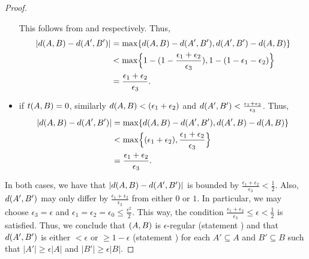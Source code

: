 \begin{lemma}
\begin{proof}
\begin{itemize}
                        This follows from
                         and
                         respectively.
                        Thus,
                        \begin{align*}
                            | d ( A,B ) - d ( A',B' ) |
                                & = \max \{ d ( A,B ) - d ( A',B' ), d ( A',B' ) - d ( A,B ) \} \\
                                & < \max \Bigl\{  1 - ( 1 - \frac{\epsilon_1 + \epsilon_2}{\epsilon_3} ),
                                    1 - ( 1 - \epsilon_1 - \epsilon_2 ) \Bigr\} \\
                                & = \frac{\epsilon_1 + \epsilon_2}{\epsilon_3}.
                        \end{align*}
                    \item if $t( A,B ) = 0$, similarly $d( A,B ) < ( \epsilon_1 + \epsilon_2 )$
                        and $d ( A',B' ) < \frac{\epsilon_1 + \epsilon_2}{\epsilon_3}$.
                        Thus,
                        \begin{align*}
                            | d ( A,B ) - d ( A',B' ) |
                                & = \max \{ d ( A,B ) - d ( A',B' ), d ( A',B ) - d ( A,B ) \} \\
                                & < \max \Bigl\{ ( \epsilon_1 + \epsilon_2 ), \frac{\epsilon_1 + \epsilon_2}{\epsilon_3} \Bigr\} \\
                                & = \frac{\epsilon_1 + \epsilon_2}{\epsilon_3}.
                        \end{align*}
                \end{itemize}
                In both cases, we have that $| d ( A,B ) - d ( A',B' ) |$ is bounded by
                $\frac{\epsilon_1 + \epsilon_2}{\epsilon_3} < \frac{1}{2}$.
                Also, $d ( A', B' )$ may only differ by $\frac{\epsilon_1 + \epsilon_2}{\epsilon_3}$ from either
                $0$ or $1$.
                In particular, we may choose $\epsilon_3 = \epsilon$ and $\epsilon_1 = \epsilon_2 = \epsilon_0 \leq \frac{\epsilon^2}{2}$.
                This way, the condition $\frac{\epsilon_1 + \epsilon_2}{\epsilon_3} \leq \epsilon < \frac{1}{2}$ is satisfied.
                Thus, we conclude that $( A,B )$ is $\epsilon$-regular (statement )
                and that $d ( A',B' )$ is either $< \epsilon$ or $\geq 1 - \epsilon$ (statement )
                for each $A' \subseteq A$ and $B' \subseteq B$ such that $|A'| \geq \epsilon |A|$ and $|B'| \geq \epsilon |B|$.
            \end{proof}
        \end{lemma}

